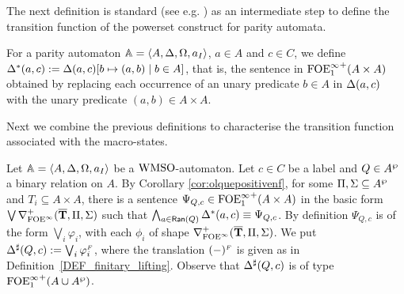 %
%

The next definition is standard (see e.g.  \cite{Walukiewicz96,Ven08}) as an intermediate step to define the transition function of the powerset construct for parity automata.

\begin{definition}\label{DEF_delta star} For a parity automaton $\mathbb{A} = \langle{A,\Delta,\Omega,a_I}\rangle$, $a \in A$ and $c \in C$, we define $\Delta^{*}(a,c) \mathrel{: =} \Delta(a,c)[b \mapsto (a,b) \mid b \in A]$, that is, the sentence in ${\mathrm{FOE}^{\infty}_1}^+(A\times A)$ obtained by replacing each occurrence of an unary predicate $b \in A$ in $\Delta(a,c)$ with the unary predicate $(a,b) \in A \times A$. \end{definition}

 Next we combine the previous definitions to characterise the transition function associated with the macro-states.

\begin{definition}\label{PROP_DeltaPowerset}
Let $\mathbb{A} = \langle{A,\Delta,\Omega,a_I}\rangle$ be a $\mathrm{WMSO}$-automaton. Let $c \in C$ be a label and $Q \in A^{\wp}$ a binary relation on $A$. By Corollary \ref{cor:olquepositivenf}, for some $\Pi,\Sigma \subseteq A^{\wp}$ and $T_i \subseteq A \times A$, there is a sentence $\Psi_{Q,c} \in {\ensuremath{\mathrm{FOE}^{\infty}_1}}^+(A\times A)$ in the basic form $\bigvee \nabla^+_{\mathrm{FOE}^{\infty}}(\overline{{\mathbf{T}}},\Pi,\Sigma)$ such that $\bigwedge_{a \in \mathsf{Ran}(Q)} \Delta^{*}(a,c) \equiv \Psi_{Q,c}$. By definition $\Psi_{Q,c}$ is of the form $\bigvee_{i}\varphi_i$, with each $\phi_{i}$ of shape $\nabla^+_{\mathrm{FOE}^{\infty}}(\overline{{\mathbf{T}}},\Pi,\Sigma)$. We put $\Delta^{\sharp}(Q,c) := \bigvee_{i}\varphi_i^{{\scriptscriptstyle F}}$, where the translation $(-)^{{\scriptscriptstyle F}}$ is given as in Definition~\ref{DEF_finitary_lifting}. Observe that $\Delta^{\sharp}(Q,c)$ is of type ${\mathrm{FOE}^{\infty}_1}^+(A \cup A^{\wp})$.
\end{definition}

